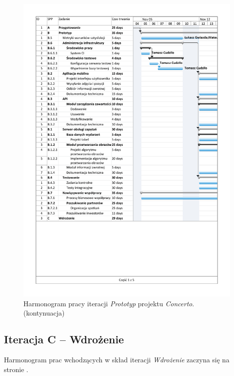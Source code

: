 \documentclass[10pt]{dokument-ppi}
\begin{document}
\begin{figure}[p]
    \ContinuedFloat
    \includegraphics[trim=1.2cm 1.2cm 1.2cm 1.2cm, page=5, width=\textwidth]{./figury/organizacja-pracy-B-prototyp}
    \caption[]{Harmonogram pracy iteracji \emph{Prototyp} projektu \emph{Concerto}. (kontynuacja)}
\end{figure}

\subsection{Iteracja C -- Wdrożenie}

Harmonogram prac wchodzących w skład iteracji \emph{Wdrożenie}
zaczyna się na stronie \pageref{fig:iteracja-wdrozenie}.
\end{document}
